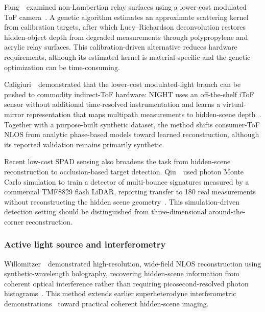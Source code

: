 Fang~\etal~examined non-Lambertian relay surfaces using a lower-cost modulated ToF camera~\cite{fangGeneticDeconvolutionToFNLOS2023}. A genetic algorithm estimates an approximate scattering kernel from calibration targets, after which Lucy--Richardson deconvolution restores hidden-object depth from degraded measurements through polypropylene and acrylic relay surfaces. This calibration-driven alternative reduces hardware requirements, although its estimated kernel is material-specific and the genetic optimization can be time-consuming.

Caligiuri~\etal~demonstrated that the lower-cost modulated-light branch can be pushed to commodity indirect-ToF hardware: NIGHT uses an off-the-shelf iToF sensor without additional time-resolved instrumentation and learns a virtual-mirror representation that maps multipath measurements to hidden-scene depth~\cite{caligiuriNIGHT2024}. Together with a purpose-built synthetic dataset, the method shifts consumer-ToF NLOS from analytic phase-based models toward learned reconstruction, although its reported validation remains primarily synthetic.

Recent low-cost SPAD sensing also broadens the task from hidden-scene reconstruction to occlusion-based target detection. Qiu~\etal~used photon Monte Carlo simulation to train a detector of multi-bounce signatures measured by a commercial TMF8829 flash LiDAR, reporting transfer to 180 real measurements without reconstructing the hidden scene geometry~\cite{qiuSimulationDrivenOcclusionNLOS2026}. This simulation-driven detection setting should be distinguished from three-dimensional around-the-corner reconstruction.\par

\subsubsection{Active light source and interferometry}
Willomitzer~\etal~demonstrated high-resolution, wide-field NLOS reconstruction using synthetic-wavelength holography, recovering hidden-scene information from coherent optical interference rather than requiring picosecond-resolved photon histograms~\cite{willomitzerSyntheticWavelengthNLOS2021}. This method extends earlier superheterodyne interferometric demonstrations~\cite{Willomitzer:18} toward practical coherent hidden-scene imaging.

